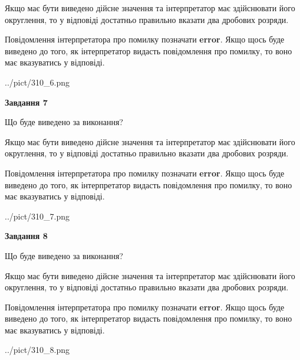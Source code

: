 \documentclass[12pt, ukrainian]{article}
\begin{document}
{\begin {Large}
Якщо має бути виведено дійсне значення та інтерпретатор має здійснювати його округлення, 
то у відповіді достатньо правильно вказати два дробових розряди.

Повідомлення інтерпретатора про помилку позначати \textbf{error}.
Якщо щось буде виведено до того, як інтерпретатор видасть повідомлення про помилку, 
то воно має вказуватись у відповіді. \par

\begin{center}
	{../pict/310_6.png}
\end{center}
\newpage

{\begin {center}\textbf{Завдання 7}\end {center}}\par
Що буде виведено за виконання? \par

Якщо має бути виведено дійсне значення та інтерпретатор має здійснювати його округлення, 
то у відповіді достатньо правильно вказати два дробових розряди.

Повідомлення інтерпретатора про помилку позначати \textbf{error}.
Якщо щось буде виведено до того, як інтерпретатор видасть повідомлення про помилку, 
то воно має вказуватись у відповіді. \par

\begin{center}
	{../pict/310_7.png}
\end{center}
\newpage

{\begin {center}\textbf{Завдання 8}\end {center}}\par
Що буде виведено за виконання? \par

Якщо має бути виведено дійсне значення та інтерпретатор має здійснювати його округлення, 
то у відповіді достатньо правильно вказати два дробових розряди.

Повідомлення інтерпретатора про помилку позначати \textbf{error}.
Якщо щось буде виведено до того, як інтерпретатор видасть повідомлення про помилку, 
то воно має вказуватись у відповіді. \par

\begin{center}
	{../pict/310_8.png}
\end{center}
\newpage


\end{Large}}
\end{document}
